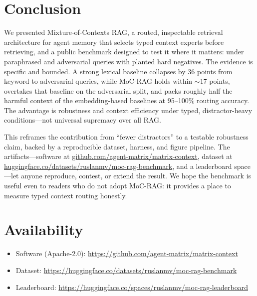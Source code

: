 \section{Conclusion}

We presented Mixture-of-Contexts RAG, a routed, inspectable retrieval
architecture for agent memory that selects typed context experts before
retrieving, and a public benchmark designed to test it where it matters: under
paraphrased and adversarial queries with planted hard negatives. The evidence is
specific and bounded. A strong lexical baseline collapses by 36 points from
keyword to adversarial queries, while MoC-RAG holds within $\sim$17 points,
overtakes that baseline on the adversarial split, and packs roughly half the
harmful context of the embedding-based baselines at 95--100\% routing accuracy. The
advantage is robustness and context efficiency under typed, distractor-heavy
conditions---not universal supremacy over all RAG.

This reframes the contribution from ``fewer distractors'' to a testable
robustness claim, backed by a reproducible dataset, harness, and figure
pipeline. The artifacts---software at
\href{https://github.com/agent-matrix/matrix-context}{github.com/agent-matrix/matrix-context},
dataset at
\href{https://huggingface.co/datasets/ruslanmv/moc-rag-benchmark}{huggingface.co/datasets/ruslanmv/moc-rag-benchmark},
and a leaderboard space---let anyone reproduce, contest, or extend the result.
We hope the benchmark is useful even to readers who do not adopt MoC-RAG: it
provides a place to measure typed context routing honestly.

\section*{Availability}
\begin{itemize}[leftmargin=1.4em,itemsep=1pt]
  \item Software (Apache-2.0): \url{https://github.com/agent-matrix/matrix-context}
  \item Dataset: \url{https://huggingface.co/datasets/ruslanmv/moc-rag-benchmark}
  \item Leaderboard: \url{https://huggingface.co/spaces/ruslanmv/moc-rag-leaderboard}
\end{itemize}
